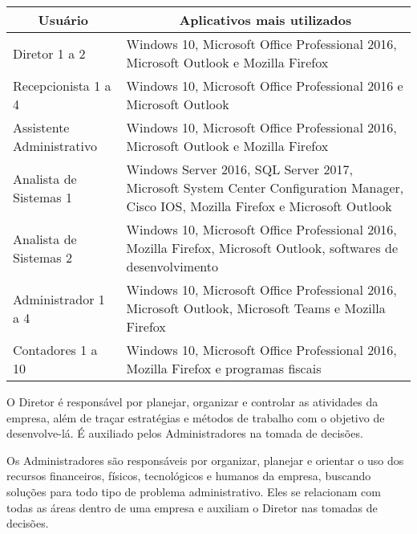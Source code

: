 \documentclass[	DIV=calc,%
							paper=a4,%
							fontsize=12pt,%
							onecolumn]{scrartcl}	 					%
\begin{document}
\begin{table}[]
	\begin{tabular}{|l|l|}
		\hline
		\multicolumn{1}{|c|}{\textbf{Usuário}} & \multicolumn{1}{c|}{\textbf{Aplicativos mais utilizados}}                                                                           \\ \hline
		Diretor 1 a 2                          & Windows 10, Microsoft Office Professional 2016, Microsoft Outlook e Mozilla Firefox                                                 \\ \hline
		Recepcionista 1 a 4                    & Windows 10, Microsoft Office Professional 2016 e Microsoft Outlook                                                                  \\ \hline
		Assistente Administrativo              & Windows 10, Microsoft Office Professional 2016, Microsoft Outlook e Mozilla Firefox                                                 \\ \hline
		Analista de Sistemas 1                 & Windows Server 2016, SQL Server 2017, Microsoft System Center Configuration Manager, Cisco IOS, Mozilla Firefox e Microsoft Outlook \\ \hline
		Analista de Sistemas 2                 & Windows 10, Microsoft Office Professional 2016, Mozilla Firefox, Microsoft Outlook, softwares de desenvolvimento                    \\ \hline
		Administrador 1 a 4                    & Windows 10, Microsoft Office Professional 2016, Microsoft Outlook, Microsoft Teams e Mozilla Firefox                                \\ \hline
		Contadores 1 a 10                      & Windows 10, Microsoft Office Professional 2016, Mozilla Firefox e programas fiscais                                                 \\ \hline
	\end{tabular}
\end{table}

O Diretor é responsável por planejar, organizar e controlar as atividades da empresa, além de traçar estratégias e métodos de trabalho com o objetivo de desenvolve-lá. É auxiliado pelos Administradores na tomada de decisões. 

Os Administradores são responsáveis por organizar, planejar e orientar o uso dos recursos financeiros, físicos, tecnológicos e humanos da empresa, buscando soluções para todo tipo de problema administrativo. Eles se relacionam com todas as áreas dentro de uma empresa e auxiliam o Diretor nas tomadas de decisões.
\end{document}
